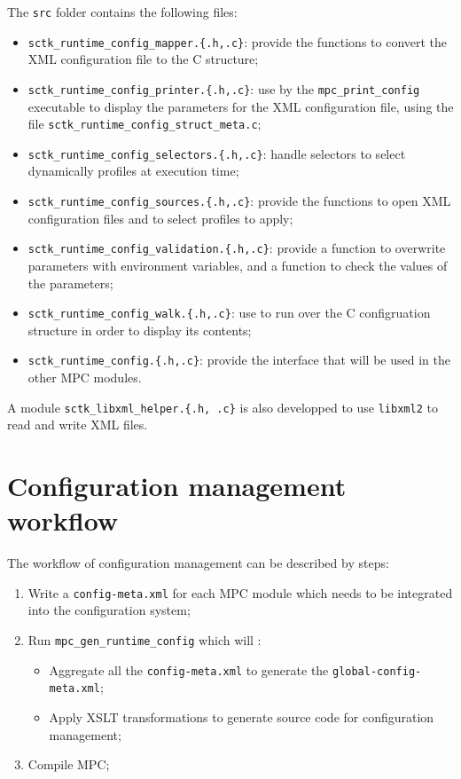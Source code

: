 \documentclass{article}
\begin{document}
The \texttt{src} folder contains the following files:
\begin{itemize}
\item \texttt{sctk\_runtime\_config\_mapper.\{.h,.c\}}: provide the functions to convert the XML configuration file to the C structure;
\item \texttt{sctk\_runtime\_config\_printer.\{.h,.c\}}: use by the \texttt{mpc\_print\_config} executable to display the parameters for the XML configuration file, using the file \texttt{sctk\_runtime\_config\_struct\_meta.c};
\item \texttt{sctk\_runtime\_config\_selectors.\{.h,.c\}}: handle selectors to select dynamically profiles at execution time;
\item \texttt{sctk\_runtime\_config\_sources.\{.h,.c\}}: provide the functions to open XML configuration files and to select profiles to apply;
\item \texttt{sctk\_runtime\_config\_validation.\{.h,.c\}}: provide a function to overwrite parameters with environment variables, and a function to check the values of the parameters;
\item \texttt{sctk\_runtime\_config\_walk.\{.h,.c\}}: use to run over the C configruation structure in order to display its contents;
\item \texttt{sctk\_runtime\_config.\{.h,.c\}}: provide the interface that will be used in the other MPC modules.
\end{itemize}

\noindent A module \texttt{sctk\_libxml\_helper.\{.h, .c\}} is also developped to use \texttt{libxml2} to read and write XML files.

\section{Configuration management workflow}

The workflow of configuration management can be described by steps:
\begin{enumerate}
\item Write a \texttt{config-meta.xml} for each MPC module which needs to be integrated into the configuration system;
\item Run \texttt{mpc\_gen\_runtime\_config} which will :
\begin{itemize}
\item Aggregate all the \texttt{config-meta.xml} to generate the \texttt{global-config-meta.xml};
\item Apply XSLT transformations to generate source code for configuration management;
\end{itemize}
\item Compile MPC;
\end{enumerate}
\end{document}
